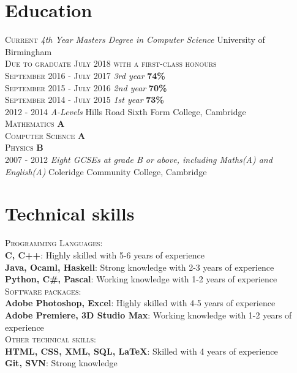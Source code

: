 \documentclass[a4paper, 10pt]{article}
\newcommand\tab[1][1cm]{\hspace*{#1}}
\begin{document}
\section{Education}
\textsc{Current} \emph{4th Year Masters Degree in Computer Science} University of Birmingham\\
 \tab\textsc{Due to graduate July 2018 with a first-class honours}\\
 \tab\textsc{September 2016 - July 2017} \emph{3rd year} \textbf{74\%} \\
 \tab\textsc{September 2015 - July 2016} \emph{2nd year} \textbf{70\%} \\
 \tab\textsc{September 2014 - July 2015} \emph{1st year} \textbf{73\%}\\
\textsc{2012 - 2014} \emph{A-Levels} Hills Road Sixth Form College, Cambridge \\
	\tab\textsc{Mathematics} \textbf{A} \\
	\tab\textsc{Computer Science} \textbf{A} \\
	\tab\textsc{Physics} \textbf{B}\\
\textsc{2007 - 2012} \emph{Eight GCSEs at grade B or above, including Maths(A) and English(A)} Coleridge Community College, Cambridge

\section{Technical skills}
 \textsc{Programming Languages:}\\
 \tab\textbf{C, C++}: Highly skilled with 5-6 years of experience\\
 \tab\textbf{Java, Ocaml, Haskell}: Strong knowledge with 2-3 years of experience\\
 \tab\textbf{Python, C\#, Pascal}: Working knowledge with 1-2 years of experience\\
 \textsc{Software packages:}\\
 \tab\textbf{Adobe Photoshop, Excel}: Highly skilled with 4-5 years of experience\\
 \tab\textbf{Adobe Premiere, 3D Studio Max}: Working knowledge with 1-2 years of experience\\
 \textsc{Other technical skills:}\\
 \tab\textbf{HTML, CSS, XML, SQL, LaTeX}: Skilled with 4 years of experience\\
 \tab\textbf{Git, SVN}: Strong knowledge

\end{document}
